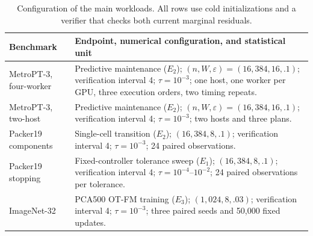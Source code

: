 \begin{table}[t]
\centering
\caption{Configuration of the main workloads. All rows use cold
initializations and a verifier that checks both current marginal residuals.}
\label{tab:workload-configs}
\scriptsize
\setlength{\tabcolsep}{3pt}
\begin{tabular}{@{}p{}p{}@{}}
\toprule
Benchmark & Endpoint, numerical configuration, and statistical unit \\
\midrule
MetroPT-3, four-worker & Predictive maintenance ($E_2$); $(n,W,\varepsilon)=(16{,}384,16,.1)$; verification interval 4; $\tau=10^{-3}$; one host, one worker per GPU, three execution orders, two timing repeats. \\
MetroPT-3, two-host & Predictive maintenance ($E_2$); $(n,W,\varepsilon)=(16{,}384,16,.1)$; verification interval 4; $\tau=10^{-3}$; two hosts and three plans. \\
Packer19 components & Single-cell transition ($E_2$); $(16{,}384,8,.1)$; verification interval 4; $\tau=10^{-3}$; 24 paired observations. \\
Packer19 stopping & Fixed-controller tolerance sweep ($E_1$); $(16{,}384,8,.1)$; verification interval 4; $\tau=10^{-4}\text{--}10^{-2}$; 24 paired observations per tolerance. \\
ImageNet-32 & PCA500 OT-FM training ($E_3$); $(1{,}024,8,.03)$; verification interval 4; $\tau=10^{-3}$; three paired seeds and 50,000 fixed updates. \\
\bottomrule
\end{tabular}
\end{table}
